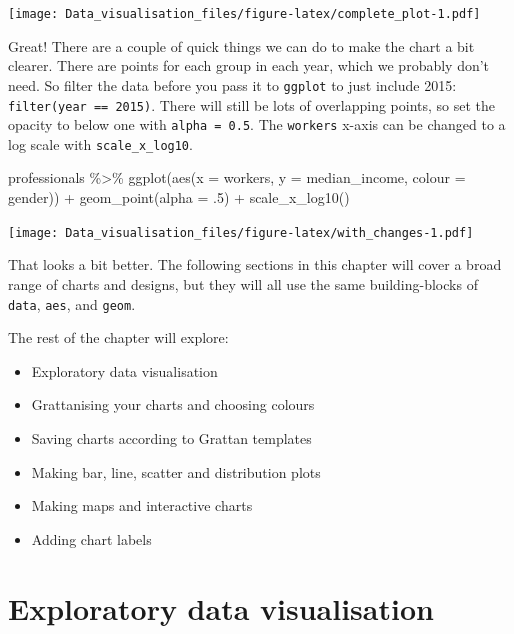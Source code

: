 \documentclass[
]{book}
\newenvironment{Shaded}{\begin{snugshade}}{\end{snugshade}}
\newcommand{\AttributeTok}[1]{\textcolor[rgb]{0.77,0.63,0.00}{#1}}
\newcommand{\DecValTok}[1]{\textcolor[rgb]{0.00,0.00,0.81}{#1}}
\newcommand{\FunctionTok}[1]{\textcolor[rgb]{0.00,0.00,0.00}{#1}}
\newcommand{\NormalTok}[1]{#1}
\newcommand{\SpecialCharTok}[1]{\textcolor[rgb]{0.00,0.00,0.00}{#1}}
\providecommand{\tightlist}{%
  \setlength{\itemsep}{0pt}\setlength{\parskip}{0pt}}
\begin{document}
\texttt{[image: Data\_visualisation\_files/figure-latex/complete\_plot-1.pdf]}

Great! There are a couple of quick things we can do to make the chart a bit clearer. There are points for each group in each year, which we probably don't need. So filter the data before you pass it to \texttt{ggplot} to just include 2015: \texttt{filter(year\ ==\ 2015)}. There will still be lots of overlapping points, so set the opacity to below one with \texttt{alpha\ =\ 0.5}. The \texttt{workers} x-axis can be changed to a log scale with \texttt{scale\_x\_log10}.

\begin{Shaded}
\begin{Highlighting}[]
\NormalTok{professionals }\SpecialCharTok{\%\textgreater{}\%} 
        \FunctionTok{ggplot}\NormalTok{(}\FunctionTok{aes}\NormalTok{(}\AttributeTok{x =}\NormalTok{ workers,}
                   \AttributeTok{y =}\NormalTok{ median\_income,}
                   \AttributeTok{colour =}\NormalTok{ gender)) }\SpecialCharTok{+} 
        \FunctionTok{geom\_point}\NormalTok{(}\AttributeTok{alpha =}\NormalTok{ .}\DecValTok{5}\NormalTok{) }\SpecialCharTok{+} 
        \FunctionTok{scale\_x\_log10}\NormalTok{()}
\end{Highlighting}
\end{Shaded}

\texttt{[image: Data\_visualisation\_files/figure-latex/with\_changes-1.pdf]}

That looks a bit better. The following sections in this chapter will cover a broad range of charts and designs, but they will all use the same building-blocks of \texttt{data}, \texttt{aes}, and \texttt{geom}.

The rest of the chapter will explore:

\begin{itemize}
\tightlist
\item
  Exploratory data visualisation
\item
  Grattanising your charts and choosing colours
\item
  Saving charts according to Grattan templates
\item
  Making bar, line, scatter and distribution plots
\item
  Making maps and interactive charts
\item
  Adding chart labels
\end{itemize}

\hypertarget{exploratory-data-visualisation}{%
\section{Exploratory data visualisation}\label{exploratory-data-visualisation}}
\end{document}
